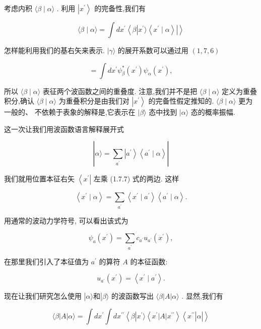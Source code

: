 \documentclass[lang=cn,newtx,10pt,scheme=chinese,thmcnt=section]{elegantbook}
\begin{document}
考虑内积 $\langle \beta \mid \alpha \rangle$ . 利用 $\left| {x}^{\prime }\right\rangle$ 的完备性,我们有

$$
\langle \beta \mid \alpha \rangle = \int d{x}^{\prime }\left\langle {\beta \left| {{x}^{\prime }\rangle \left\langle {{x}^{\prime } \mid \alpha }\right\rangle }\right| }\right\rangle
$$

怎样能利用我们的基右矢来表示. $|\gamma \rangle$ 的展开系数可以通过用 $\left( {1,7,6}\right)$

$$
= \int d{x}^{\prime }{\psi }_{\beta }^{ * }\left( {x}^{\prime }\right) {\psi }_{\alpha }\left( {x}^{\prime }\right) ,
$$

所以 $\langle \beta \mid \alpha \rangle$ 表征两个波函数之间的重叠度. 注意,我们并不是把 $\langle \beta \mid \alpha \rangle$ 定义为重叠积分,确认 $\langle \beta \mid \alpha \rangle$ 为重叠积分是由我们对 $\left| {x}^{\prime }\right\rangle$ 的完备性假定推知的. $\langle \beta \mid \alpha \rangle$ 更为一般的、 不依赖于表象的解释是,它表示在 $|\beta \rangle$ 态中找到 $|\alpha \rangle$ 态的概率振幅.

这一次让我们用波函数语言解释展开式

$$
\left| {\alpha \rangle = \mathop{\sum }\limits_{{a}^{\prime }}\left| {a}^{\prime }\right\rangle \left\langle {{a}^{\prime } \mid \alpha }\right\rangle }\right| \tag{1.7.7}
$$

我们就用位置本征右矢 $\left\langle {x}^{\prime }\right|$ 左乘 (1.7.7) 式的两边. 这样

$$
\left\langle {{x}^{\prime } \mid \alpha }\right\rangle = \mathop{\sum }\limits_{{a}^{\prime }}\left\langle {{x}^{\prime } \mid {a}^{\prime }}\right\rangle \left\langle {{a}^{\prime } \mid \alpha }\right\rangle . \tag{1.7.8}
$$

用通常的波动力学符号, 可以看出该式为

$$
{\psi }_{a}\left( {x}^{\prime }\right) = \mathop{\sum }\limits_{{a}^{\prime }}{c}_{{a}^{\prime }}{u}_{{a}^{\prime }}\left( {x}^{\prime }\right) ,
$$

在那里我们引入了本征值为 ${a}^{\prime }$ 的算符 $A$ 的本征函数:

$$
{u}_{{a}^{\prime }}\left( {x}^{\prime }\right) = \left\langle {{x}^{\prime } \mid {a}^{\prime }}\right\rangle . \tag{1.7.9}
$$

现在让我们研究怎么使用 $\left| {\alpha \rangle \text{和}}\right| \beta \rangle$ 的波函数写出 $\langle \beta \left| A\right| \alpha \rangle$ . 显然,我们有

$$
\langle \beta \left| A\right| \alpha \rangle = \int d{x}^{\prime }\int d{x}^{\prime \prime }\left\langle {\beta \left| {{x}^{\prime }\rangle \left\langle {{x}^{\prime }\left| A\right| {x}^{\prime \prime }}\right\rangle \left\langle {x}^{\prime \prime }\right| \alpha }\right| }\right\rangle \tag{1.7.10}
$$
\end{document}
